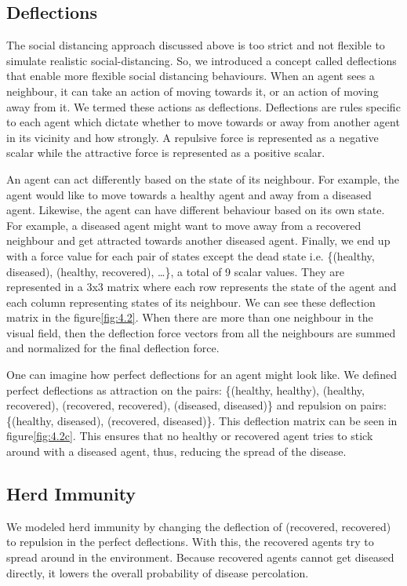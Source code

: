 \documentclass[a4paper,11pt]{article}
\begin{document}
    \subsection{Deflections}\label{subsec:deflections}
    The social distancing approach discussed above is too strict and not flexible to simulate realistic social-distancing.
    So, we introduced a concept called deflections that enable more flexible social distancing behaviours.
    When an agent sees a neighbour, it can take an action of moving towards it, or an action of moving away from it.
    We termed these actions as deflections.
    Deflections are rules specific to each agent which dictate whether to move towards or away from another agent in its vicinity and how strongly.
    A repulsive force is represented as a negative scalar while the attractive force is represented as a positive scalar.

    An agent can act differently based on the state of its neighbour.
    For example, the agent would like to move towards a healthy agent and away from a diseased agent.
    Likewise, the agent can have different behaviour based on its own state.
    For example, a diseased agent might want to move away from a recovered neighbour and get attracted towards another diseased agent.
    Finally, we end up with a force value for each pair of states except the dead state i.e.
    \{(healthy, diseased), (healthy, recovered), \ldots \}, a total of 9 scalar values.
    They are represented in a 3x3 matrix where each row represents the state of the agent and each column representing states of its neighbour.
    We can see these deflection matrix in the figure\ref{fig:4.2}.
    When there are more than one neighbour in the visual field, then the deflection force vectors from all the neighbours are summed and normalized for the final deflection force.

    One can imagine how perfect deflections for an agent might look like.
    We defined perfect deflections as attraction on the pairs: \{(healthy, healthy), (healthy, recovered), (recovered, recovered), (diseased, diseased)\} and repulsion on pairs: \{(healthy, diseased), (recovered, diseased)\}.
    This deflection matrix can be seen in figure\ref{fig:4.2c}.
    This ensures that no healthy or recovered agent tries to stick around with a diseased agent, thus, reducing the spread of the disease.

    \subsection{Herd Immunity}\label{subsec:herd-immunity}
    We modeled herd immunity\cite{herdImm} by changing the deflection of (recovered, recovered) to repulsion in the perfect deflections.
    With this, the recovered agents try to spread around in the environment.
    Because recovered agents cannot get diseased directly, it lowers the overall probability of disease percolation.
\end{document}
